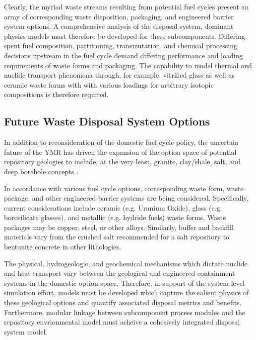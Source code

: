 Clearly, the myriad waste streams resulting from potential fuel cycles 
present an array of corresponding waste disposition, packaging, and 
engineered barrier system options. A comprehensive analysis of the 
disposal system, dominant physics models must therefore be developed 
for these subcomponents.  Differing spent fuel composition, 
partitioning, transmutation, and chemical processing decisions 
upstream in the fuel cycle demand differing performance and loading 
requirements of waste forms and packaging. The capability to model 
thermal and nuclide transport phenomena through, for example, 
vitrified glass as well as ceramic waste forms with with various 
loadings for arbitrary isotopic compositions is therefore required.  

\subsection{Future Waste Disposal System Options}

In addition to reconsideration of the domestic fuel cycle policy, the 
uncertain future of the \gls{YMR} has driven the expansion of the option 
space of potential repository geologies to include, at the very least, 
granite, clay/shale, salt, and deep borehole concepts \cite{nutt_used_2010}. 

In accordance with various fuel cycle options, corresponding waste 
form, waste package, and other engineered barrier systems are being 
considered. Specifically, current considerations include ceramic (e.g.  
Uranium Oxide), glass (e.g.  borosilicate glasses), and metallic (e.g.  
hydride fuels) waste forms. Waste packages may be copper, steel, or 
other alloys. Similarly, buffer and backfill materials vary from the 
crushed salt recommended for a salt repository to bentonite concrete 
in other lithologies. %

The physical, hydrogeologic, and geochemical mechanisms which dictate 
nuclide and heat transport vary between the geological and engineered 
containment systems in the domestic option space.  Therefore, in 
support of the system level simulation effort, models must be 
developed which capture the salient physics of these geological 
options and quantify associated disposal metrics and benefits.  
Furthermore, modular linkage between subcomponent process modules and 
the repository envrionmental model must acheive a cohesively 
integrated disposal system model. 


